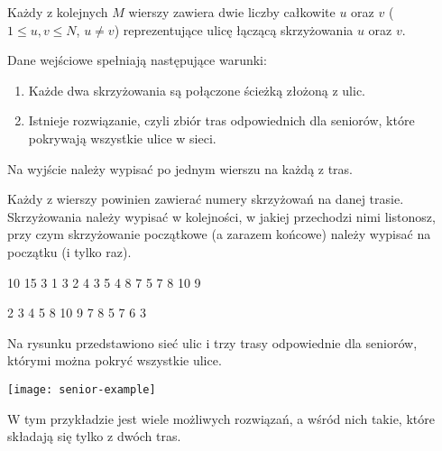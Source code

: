 \documentclass{boi2014-pl}
\begin{document}
    Każdy z kolejnych $M$ wierszy zawiera dwie liczby całkowite
    $u$ oraz $v$ ($1 \le u,v \le N$, $u \ne v$) reprezentujące ulicę łączącą
    skrzyżowania $u$ oraz $v$.

    Dane wejściowe spełniają następujące warunki:
    \begin{enumerate}
        \item Każde dwa skrzyżowania są połączone ścieżką złożoną z ulic.
        \item Istnieje rozwiązanie, czyli zbiór tras odpowiednich dla seniorów,
          które pokrywają wszystkie ulice w sieci.
    \end{enumerate}

    \Output
    Na wyjście należy wypisać po jednym wierszu na każdą z tras.

    Każdy z wierszy powinien zawierać numery skrzyżowań na danej trasie.
    Skrzyżowania należy wypisać w kolejności, w jakiej przechodzi nimi listonosz,
    przy czym skrzyżowanie początkowe (a zarazem końcowe) należy wypisać na początku (i tylko raz).


    \Example

    \example
    {
        10 15  3  1 3  2 4  3 5  4 8  7  5 7  8  10  9
    }
    {
        2 3 4 5 8 10 9  7 8  5 7 6 3

    }
    {
        Na rysunku przedstawiono sieć ulic i trzy trasy odpowiednie dla seniorów,
        którymi można pokryć wszystkie ulice.

        \texttt{[image: senior-example]}

        W tym przykładzie jest wiele możliwych rozwiązań, a wśród nich takie, które
        składają się tylko z dwóch tras.
    
    }
\end{document}
